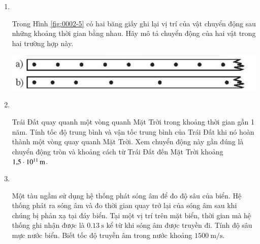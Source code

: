 \begin{enumerate}[label=\bfseries Bài \arabic*:,leftmargin=1.5cm]
\item {}\\
{Trong Hình \ref{fig:0002-5} có hai băng giấy ghi lại vị trí của vật chuyển động sau những khoảng thời gian bằng nhau. Hãy mô tả chuyển động của hai vật trong hai trường hợp này.
	\begin{center}
		\includegraphics[width=0.4\linewidth]{../figs/VN10-2023-PH-TP0002-5}
		\label{fig:0002-5}
	\end{center}

}

\item {}\\
{Trái Đất quay quanh một vòng quanh Mặt Trời trong khoảng thời gian gần 1 năm. Tính tốc độ trung bình và vận tốc trung bình của Trái Đất khi nó hoàn thành một vòng quay quanh Mặt Trời. Xem chuyển động này gần đúng là chuyển động tròn và khoảng cách từ Trái Đất đến Mặt Trời khoảng $\SI{1.5E11}{\meter}$.

}

\item {}\\
{Một tàu ngầm sử dụng hệ thống phát sóng âm để đo độ sâu của biển. Hệ thống phát ra sóng âm và đo thời gian quay trở lại của sóng âm sau khi chúng bị phản xạ tại đáy biển. Tại một vị trí trên mặt biển, thời gian mà hệ thống ghi nhận được là $\SI{0.13}{\second}$ kể từ khi sóng âm được truyền đi. Tính độ sâu mực nước biển. Biết tốc độ truyền âm trong nước khoảng $\SI{1500}{\meter/\second}$.

}
\end{enumerate}
